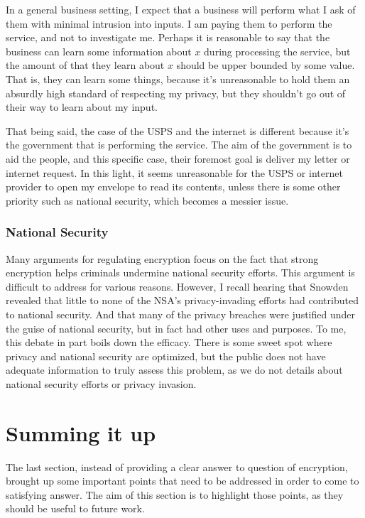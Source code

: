 \documentclass[11pt]{article}
\begin{document}
In a general business setting, I expect that a business will perform what I ask of them with minimal intrusion into inputs.
I am paying them to perform the service, and not to investigate me.
Perhaps it is reasonable to say that the business can learn some information about $x$ during processing the service, but the amount of that they learn about $x$ should be upper bounded by some value.
That is, they can learn some things, because it's unreasonable to hold them an absurdly high standard of respecting my privacy, but they shouldn't go out of their way to learn about my input.

That being said, the case of the USPS and the internet is different because it's the government that is performing the service.
The aim of the government is to aid the people, and this specific case, their foremost goal is deliver my letter or internet request.
In this light, it seems unreasonable for the USPS or internet provider to open my envelope to read its contents, unless there is some other priority such as national security, which becomes a messier issue.

\subsubsection{National Security}
Many arguments for regulating encryption focus on the fact that strong encryption helps criminals undermine national security efforts.
This argument is difficult to address for various reasons.
However, I recall hearing that Snowden revealed that little to none of the NSA's privacy-invading efforts had contributed to national security.
And that many of the privacy breaches were justified under the guise of national security, but in fact had other uses and purposes.
To me, this debate in part boils down the efficacy.
There is some sweet spot where privacy and national security are optimized, but the public does not have adequate information to truly assess this problem, as we do not details about national security efforts or privacy invasion.

\section{Summing it up}
The last section, instead of providing a clear answer to question of encryption, brought up some important points that need to be addressed in order to come to satisfying answer.
The aim of this section is to highlight those points, as they should be useful to future work.
\end{document}
